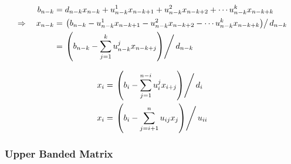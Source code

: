 \documentclass[11pt]{article}
\begin{document}

\begin{align}
    b_{n-k} &= d_{n-k} x_{n-k}+u_{n-k}^{1} x_{n-k+1}+u_{n-k}^{2} x_{n-k+2} + \cdots u_{n-k}^{k} x_{n-k+k}\\
    \Rightarrow \quad x_{n-k} &= \left.\left(b_{n-k}-u_{n-k}^{1} x_{n-k+1}-u_{n-k}^{2} x_{n-k+2} - \cdots
        u_{n-k}^{k} x_{n-k+k}\right) \right/ d_{n-k}\\
        &= \left.\left(b_{n-k}-\sum_{j=1}^{k} u_{n-k}^{j} x_{n-k+j}\right) \right/ d_{n-k} \\
\end{align}


\begin{align}
    x_{i} &= \left.\left(b_{i}-\sum_{j=1}^{n-i} u_{i}^{j} x_{i+j}\right) \right/ d_{i} \\
    x_{i} &= \left.\left(b_{i}-\sum_{j=i+1}^{n} u_{i j} x_{j}\right) \right/ u_{i i}
\end{align}



\subsubsection*{Upper Banded Matrix}
\end{document}
